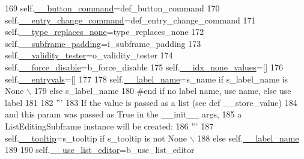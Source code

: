 \begin{DoxyCode}
169         self.\hyperlink{classnegui_1_1pgguiutilities_1_1KeyValFrame_a0a4e9593fba1c3c0defc524ada661261}{\_\_button\_command}=def\_button\_command
170         self.\hyperlink{classnegui_1_1pgguiutilities_1_1KeyValFrame_ab739e0f7c56624637e862d2c1fcf1d7c}{\_\_entry\_change\_command}=def\_entry\_change\_command
171         self.\hyperlink{classnegui_1_1pgguiutilities_1_1KeyValFrame_ad522d9fdeb611fb4854199a952a782d9}{\_\_type\_replaces\_none}=type\_replaces\_none
172         self.\hyperlink{classnegui_1_1pgguiutilities_1_1KeyValFrame_a7509de20f07f2afdc2bc5fda8bec6c61}{\_\_subframe\_padding}=i\_subframe\_padding
173         self.\hyperlink{classnegui_1_1pgguiutilities_1_1KeyValFrame_a9d31fa82430833c2c2f23e4b28ac95f9}{\_\_validity\_tester}=o\_validity\_tester
174         self.\hyperlink{classnegui_1_1pgguiutilities_1_1KeyValFrame_aecb0c3c8630045b769f6bed4044d658b}{\_\_force\_disable}=b\_force\_disable
175         self.\hyperlink{classnegui_1_1pgguiutilities_1_1KeyValFrame_afbe0c687ff602e5d8e9eff5a410e98b4}{\_\_idx\_none\_values}=[]
176         self.\hyperlink{classnegui_1_1pgguiutilities_1_1KeyValFrame_a01ff8dc2236ac230d5349d72cc80663e}{\_\_entryvals}=[]
177         
178         self.\hyperlink{classnegui_1_1pgguiutilities_1_1KeyValFrame_a712bc54aa2ed3383fc4fe78943ed2ccb}{\_\_label\_name}=s\_name \textcolor{keywordflow}{if} s\_label\_name \textcolor{keywordflow}{is} \textcolor{keywordtype}{None} \(\backslash\)
179                                             \textcolor{keywordflow}{else} s\_label\_name       
180         \textcolor{comment}{#end if no label name, use name, else use label}
181 
182         \textcolor{stringliteral}{'''}
183 \textcolor{stringliteral}{        If the value is passed as a list (see def \_\_store\_value)}
184 \textcolor{stringliteral}{        and this param was passed as True in the \_\_init\_\_ args,}
185 \textcolor{stringliteral}{        a ListEditingSubframe instance will be created:}
186 \textcolor{stringliteral}{        '''}
187         self.\hyperlink{classnegui_1_1pgguiutilities_1_1KeyValFrame_aec6187c09dbe40b76b4452b25a0a141a}{\_\_tooltip}=s\_tooltip \textcolor{keywordflow}{if} s\_tooltip \textcolor{keywordflow}{is} \textcolor{keywordflow}{not} \textcolor{keywordtype}{None} \(\backslash\)
188                                         \textcolor{keywordflow}{else} self.\hyperlink{classnegui_1_1pgguiutilities_1_1KeyValFrame_a712bc54aa2ed3383fc4fe78943ed2ccb}{\_\_label\_name}
189 
190         self.\hyperlink{classnegui_1_1pgguiutilities_1_1KeyValFrame_ac5f010d35ad130077b2dc26001f4267a}{\_\_use\_list\_editor}=b\_use\_list\_editor

\end{DoxyCode}
